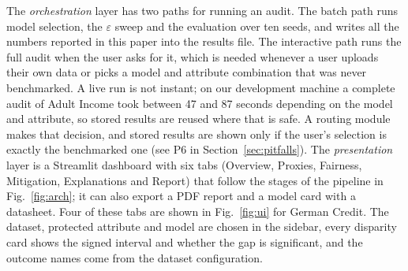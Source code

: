 \documentclass[conference]{IEEEtran}
\newcommand{\eps}{\varepsilon}
\begin{document}
The \emph{orchestration} layer has two paths for running an audit. The batch path runs model selection, the $\eps$ sweep and the evaluation over ten seeds, and writes all the numbers reported in this paper into the results file. The interactive path runs the full audit when the user asks for it, which is needed whenever a user uploads their own data or picks a model and attribute combination that was never benchmarked. A live run is not instant; on our development machine a complete audit of Adult Income took between 47 and 87 seconds depending on the model and attribute, so stored results are reused where that is safe. A routing module makes that decision, and stored results are shown only if the user's selection is exactly the benchmarked one (see P6 in Section~\ref{sec:pitfalls}). The \emph{presentation} layer is a Streamlit dashboard with six tabs (Overview, Proxies, Fairness, Mitigation, Explanations and Report) that follow the stages of the pipeline in Fig.~\ref{fig:arch}; it can also export a PDF report and a model card with a datasheet. Four of these tabs are shown in Fig.~\ref{fig:ui} for German Credit. The dataset, protected attribute and model are chosen in the sidebar, every disparity card shows the signed interval and whether the gap is significant, and the outcome names come from the dataset configuration.
\end{document}
